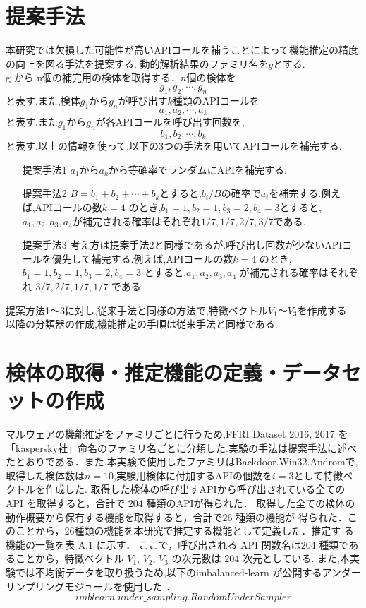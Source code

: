 \documentclass{thesis}
\begin{document}
\section{提案手法}
本研究では欠損した可能性が高いAPIコールを補うことによって機能推定の精度の向上を図る手法を提案する.
動的解析結果のファミリ名を$g$とする.\\
g から n個の補完用の検体を取得する．$n$個の検体を
          $$ g_1, g_2, \cdots, g_n$$
と表す.また,検体$g_1$から$g_n$が呼び出す$k$種類のAPIコールを
               $$a_1, a_2, \cdots, a_k$$
と表す.また$g_1$から$g_n$が各APIコールを呼び出す回数を,
                $$b_1, b_2, \cdots, b_k$$
と表す.以上の情報を使って,以下の3つの手法を用いてAPIコールを補完する.\\
\begin{itemize}
\item[提案手法1] $a_1$から$a_k$から等確率でランダムにAPIを補完する.
\item[提案手法2]$B=b_1+b_2+\cdots+b_k $とすると,$b_i/B$の確率で$a_i $を補完する.例えば,APIコールの数$ k=4$ のとき,$b_1=1, b_2=1, b_3=2, b_4=3 $とすると,$a_1, a_2, a_3, a_4 $が補完される確率はそれぞれ$1/7, 1/7, 2/7, 3/7 $である.
\item[提案手法3]考え方は提案手法2と同様であるが.呼び出し回数が少ないAPIコールを優先して補完する.例えば,APIコールの数$ k=4$ のとき,$b_1=1, b_2=1, b_3=2, b_4=3$ とすると,$a_1, a_2, a_3, a_4$ が補完される確率はそれぞれ $3/7, 2/7, 1/7, 1/7$ である.
\end{itemize}
提案方法1～3に対し,従来手法と同様の方法で,特徴ベクトル$V_1$～$V_3$を作成する.
以降の分類器の作成,機能推定の手順は従来手法と同様である.

\section{検体の取得・推定機能の定義・データセットの作成}
マルウェアの機能推定をファミリごとに行うため,FFRI Dataset 2016, 2017 を「kaspersky社」命名のファミリ名ごとに分類した.実験の手法は提案手法に述べたとおりである．また,本実験で使用したファミリはBackdoor.Win32.Andromで,取得した検体数は$n=10$,実験用検体に付加するAPIの個数を$i=3$として特徴ベクトルを作成した.
取得した検体の呼び出すAPIから呼び出されている全ての API を取得すると，合計で $204$ 種類のAPIが得られた．
取得した全ての検体の動作概要から保有する機能を取得すると，合計で$ 26$ 種類の機能が
得られた．このことから，$26 $種類の機能を本研究で推定する機能として定義した．推定す
る機能の一覧を表 A.1 に示す．
ここで，呼び出される API 関数名は$ 204$ 種類であることから，特徴ベクトル $V_1$, $V_2$, $V_3$ の次元数は $204$ 次元としている.
また,本実験では不均衡データを取り扱うため,以下のimbalanced-learn が公開するアンダーサンプリングモジュールを使用した
\cite{undersampling}．
\[
	imblearn.under\_sampling.RandomUnderSampler
\]
\end{document}

